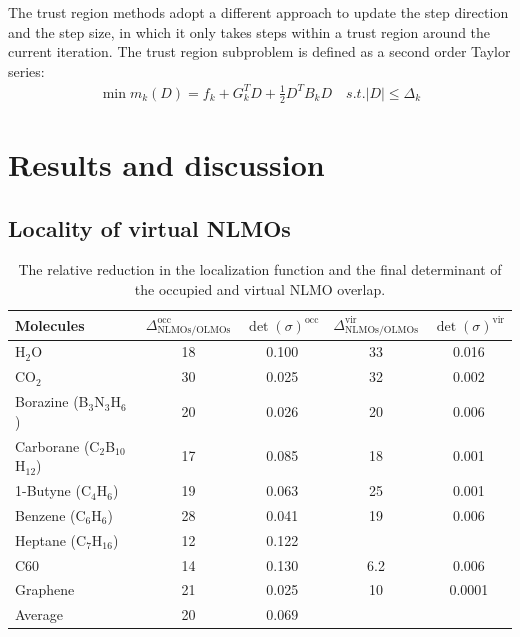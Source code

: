 \documentclass[aps,prl,reprint,amsmath,amssymb]{revtex4-1}
\begin{document}
The trust region methods adopt a different approach to update the step direction and the step size, in which it only takes steps within a trust region around the current iteration. The trust region subproblem  is defined as a second order Taylor series:
%
\begin{equation} \label{eq:tr_subproblem}
\begin{split}
\min m_{k}(D) = f_{k} + G_{k}^T D + \frac{1}{2}D^T B_{k}D    \quad s.t. \lvert D \rvert \leq \Delta_{k}
\end{split}
\end{equation}
%





\section{Results and discussion}
\subsection{Locality of virtual NLMOs}


\begin{table}[htbp]
\caption{The relative reduction in the localization function and the final determinant of the occupied and virtual NLMO overlap.}
\label{tab:loc}
\centering
\begin{tabular}{l c c c c}
\hline\hline
Molecules & $\Delta_{\text{NLMOs/OLMOs}}^{\text{occ}}$ & $\det(\sigma)^{\text{occ}} $ & $\Delta_{\text{NLMOs/OLMOs}}^{\text{vir}}$ & $\det(\sigma)^{\text{vir}}$ \\
\hline
H$_2$O & 18 & 0.100 & 33 & 0.016 \\ 
CO$_2$ & 30 & 0.025 & 32 & 0.002\\
Borazine (B$_3$N$_3$H$_6$) & 20 & 0.026 & 20 & 0.006 \\
Carborane (C$_2$B$_{10}$H$_{12}$) & 17 & 0.085 & 18 & 0.001 \\ 
1-Butyne (C$_4$H$_6$) & 19 & 0.063 & 25 & 0.001 \\
Benzene (C$_6$H$_6$) & 28 & 0.041 & 19 & 0.006 \\ 
Heptane (C$_7$H$_{16}$) & 12 & 0.122 & & \\ 
C60 & 14 & 0.130 & 6.2 & 0.006 \\
Graphene & 21 & 0.025 & 10 & 0.0001 \\
\hline
Average & 20 & 0.069 & & \\
\hline
\hline
\end{tabular}
\label{table:nonlin}
\end{table}
\end{document}
